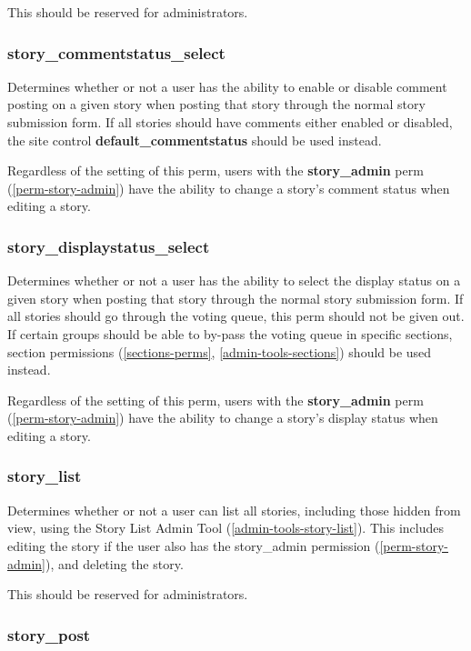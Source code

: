 This should be reserved for administrators.

\subsubsection{story\_commentstatus\_select}
\label{perm-story-commentstatus-select}

Determines whether or not a user has the ability to enable or disable comment posting on a given story when posting that story through the normal story submission form. If all stories should have comments either enabled or disabled, the site control {\bf default\_commentstatus} should be used instead.

Regardless of the setting of this perm, users with the {\bf story\_admin} perm (\ref{perm-story-admin}) have the ability to change a story's comment status when editing a story.

\subsubsection{story\_displaystatus\_select}
\label{perm-story-displaystatus-select}

Determines whether or not a user has the ability to select the display status on a given story when posting that story through the normal story submission form. If all stories should go through the voting queue, this perm should not be given out. If certain groups should be able to by-pass the voting queue in specific sections, section permissions (\ref{sections-perms}, \ref{admin-tools-sections}) should be used instead.

Regardless of the setting of this perm, users with the {\bf story\_admin} perm (\ref{perm-story-admin}) have the ability to change a story's display status when editing a story.

\subsubsection{story\_list}
\label{perm-story-list}

Determines whether or not a user can list all stories, including those hidden from view, using the Story List Admin Tool (\ref{admin-tools-story-list}).  This includes editing the story if the user also has the story\_admin permission (\ref{perm-story-admin}), and deleting the story.

This should be reserved for administrators.

\subsubsection{story\_post}
\label{perm-story-post}

